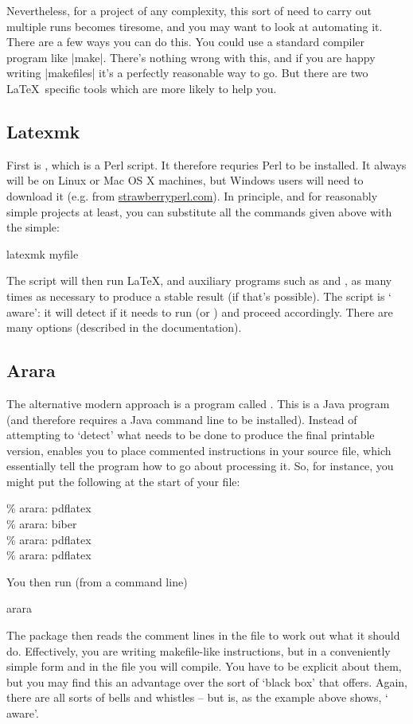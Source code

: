Nevertheless, for a project of any complexity, this sort of need to
carry out multiple runs becomes tiresome, and you may want to look at
automating it. There are a few ways you can do this. You could use a
standard compiler program like |make|. There's nothing wrong with
this, and if you are happy writing |makefiles| it's a perfectly
reasonable way to go. But there are two \LaTeX\ specific tools which
are more likely to help you.

\subsection{Latexmk}
First is , which is a Perl script. It therefore
requries Perl to be installed. It always will be on Linux or Mac OS X
machines, but Windows users will need to download it (e.g. from
\url{strawberryperl.com}). In principle, and for reasonably simple
projects at least, you can substitute all the commands given above
with the simple:
\begin{pseudoverb}
latexmk myfile
\end{pseudoverb}
The script will then run \LaTeX, and auxiliary programs such as
 and , as many times as necessary to
produce a stable result (if that's possible). The 
script is ` aware': it will detect if it needs to run
 (or \bibtex) and proceed accordingly. There are many
options (described in the documentation).

\subsection{Arara}

The alternative modern approach is a program called
. This is a Java program (and therefore requires a Java
command line to be installed). Instead of attempting to `detect' what
needs to be done to produce the final printable version,
 enables you to place commented instructions in your
source file, which essentially tell the program how to go about
processing it. So, for instance, you might put the following at the
start of your file:
\begin{pseudoverb}
\% arara: pdflatex\\
\% arara: biber\\
\% arara: pdflatex\\
\% arara: pdflatex
\end{pseudoverb}
You then run (from a command line)
\begin{pseudoverb}
arara 
\end{pseudoverb}
The package then reads the comment lines in the file to work out what
it should do. Effectively, you are writing makefile-like instructions,
but in a conveniently simple form and in the file you will
compile. You have to be explicit about them, but you may find this an
advantage over the sort of `black box' that 
offers. Again, there are all sorts of bells and whistles -- but
 is, as the example above shows, `
aware'.

